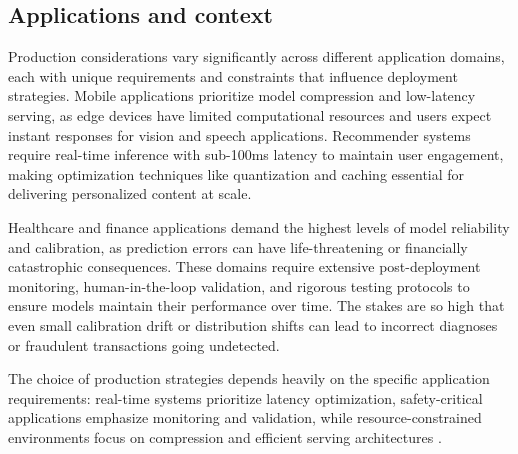 \subsection{Applications and context}

Production considerations vary significantly across different application domains, each with unique requirements and constraints that influence deployment strategies. Mobile applications prioritize model compression and low-latency serving, as edge devices have limited computational resources and users expect instant responses for vision and speech applications. Recommender systems require real-time inference with sub-100ms latency to maintain user engagement, making optimization techniques like quantization and caching essential for delivering personalized content at scale.

Healthcare and finance applications demand the highest levels of model reliability and calibration, as prediction errors can have life-threatening or financially catastrophic consequences. These domains require extensive post-deployment monitoring, human-in-the-loop validation, and rigorous testing protocols to ensure models maintain their performance over time. The stakes are so high that even small calibration drift or distribution shifts can lead to incorrect diagnoses or fraudulent transactions going undetected.

The choice of production strategies depends heavily on the specific application requirements: real-time systems prioritize latency optimization, safety-critical applications emphasize monitoring and validation, while resource-constrained environments focus on compression and efficient serving architectures \textcite{Ronneberger2015,Prince2023}.
